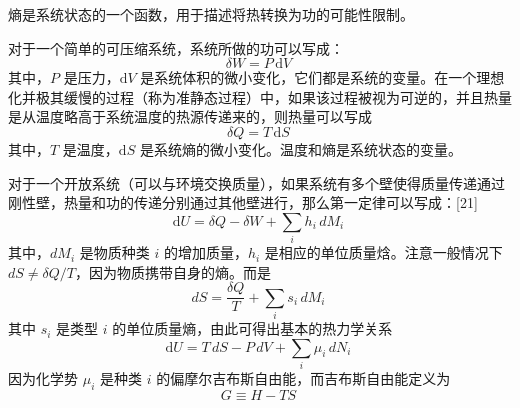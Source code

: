 熵是系统状态的一个函数，用于描述将热转换为功的可能性限制。

对于一个简单的可压缩系统，系统所做的功可以写成：
\[
\delta W = P \, \mathrm{d}V~
\]
其中，\( P \) 是压力，\( \mathrm{d}V \) 是系统体积的微小变化，它们都是系统的变量。在一个理想化并极其缓慢的过程（称为准静态过程）中，如果该过程被视为可逆的，并且热量是从温度略高于系统温度的热源传递来的，则热量可以写成
\[
\delta Q = T \, \mathrm{d}S~
\]
其中，\( T \) 是温度，\( \mathrm{d}S \) 是系统熵的微小变化。温度和熵是系统状态的变量。

对于一个开放系统（可以与环境交换质量），如果系统有多个壁使得质量传递通过刚性壁，热量和功的传递分别通过其他壁进行，那么第一定律可以写成：[21]
\[
\mathrm{d}U = \delta Q - \delta W + \sum_{i} h_{i} \, dM_{i}~
\]
其中，\( dM_{i} \) 是物质种类 \( i \) 的增加质量，\( h_{i} \) 是相应的单位质量焓。注意一般情况下 \( dS \neq \delta Q / T \)，因为物质携带自身的熵。而是
\[
dS = \frac{\delta Q}{T} + \sum_{i} s_{i} \, dM_{i}~
\]
其中 \( s_{i} \) 是类型 \( i \) 的单位质量熵，由此可得出基本的热力学关系
\[
\mathrm{d}U = T \, dS - P \, dV + \sum_{i} \mu_{i} \, dN_{i}~
\]
因为化学势 \( \mu_{i} \) 是种类 \( i \) 的偏摩尔吉布斯自由能，而吉布斯自由能定义为
\[
G \equiv H - TS~
\]